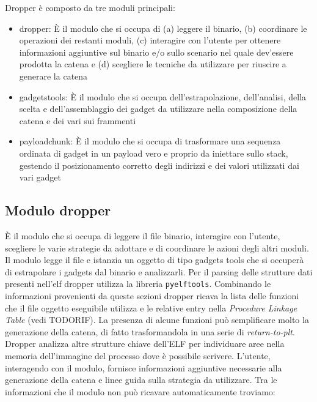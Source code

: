 Dropper è composto da tre moduli principali:

\begin{itemize}

  \item dropper: È il modulo che si occupa di (a) leggere il binario,
    (b) coordinare le operazioni dei restanti moduli, (c) interagire
    con l'utente per ottenere informazioni aggiuntive sul binario e/o
    sullo scenario nel quale dev'essere prodotta la catena e (d)
    scegliere le tecniche da utilizzare per riuscire a generare la
    catena

  \item gadgetstools: È il modulo che si occupa dell'estrapolazione,
    dell'analisi, della scelta e dell'assemblaggio dei gadget da utilizzare nella
    composizione della catena e dei vari sui frammenti

  \item payloadchunk: È il modulo che si occupa di trasformare una
    sequenza ordinata di gadget in un payload vero e proprio da
    iniettare sullo stack, gestendo il posizionamento corretto degli
    indirizzi e dei valori utilizzati dai vari gadget

\end{itemize}

\subsection{Modulo dropper}

È il modulo che si occupa di leggere il file binario, interagire con
l'utente, scegliere le varie strategie da adottare e di coordinare le
azioni degli altri moduli. Il modulo legge il file e istanzia un
oggetto di tipo gadgets tools che si occuperà di estrapolare i gadgets
dal binario e analizzarli. Per il parsing delle strutture dati
presenti nell'elf dropper utilizza la libreria
\lstinline{pyelftools}\cite{pyelftools}. Combinando le informazioni
provenienti da queste sezioni dropper ricava la lista delle funzioni
che il file oggetto eseguibile utilizza e le relative entry nella
\emph{Procedure Linkage Table} (vedi TODORIF). La presenza di alcune
funzioni può semplificare molto la generazione della catena, di fatto
trasformandola in una serie di \emph{return-to-plt}. Dropper analizza
altre strutture chiave dell'ELF per individuare aree nella memoria
dell'immagine del processo dove è possibile scrivere. L'utente,
interagendo con il modulo, fornisce informazioni aggiuntive necessarie
alla generazione della catena e linee guida sulla strategia da
utilizzare. Tra le informazioni che il modulo non può ricavare
automaticamente troviamo:

